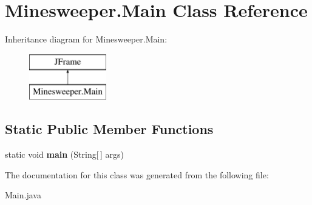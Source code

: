 \hypertarget{class_minesweeper_1_1_main}{}\section{Minesweeper.\+Main Class Reference}
\label{class_minesweeper_1_1_main}
Inheritance diagram for Minesweeper.\+Main\+:\begin{figure}[H]
\begin{center}
\leavevmode
\includegraphics[height=2.000000cm]{class_minesweeper_1_1_main}
\end{center}
\end{figure}
\subsection*{Static Public Member Functions}
\begin{DoxyCompactItemize}
\item 
\mbox{\label{class_minesweeper_1_1_main_adb90ffabc843f99f832232a3c0a7e192}} 
static void {\bfseries main} (String\mbox{[}$\,$\mbox{]} args)
\end{DoxyCompactItemize}


The documentation for this class was generated from the following file\+:\begin{DoxyCompactItemize}
\item 
Main.\+java\end{DoxyCompactItemize}

